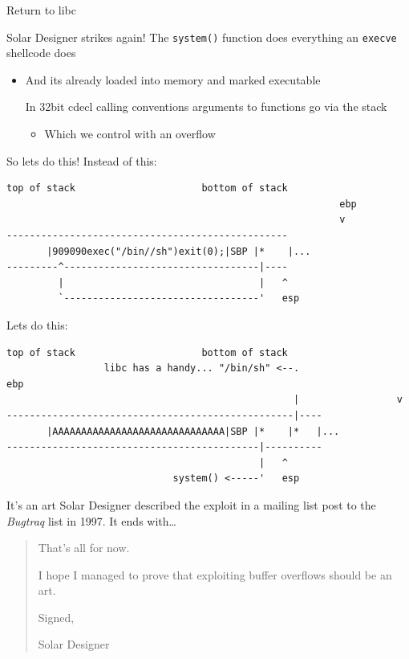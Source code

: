 \documentclass[9pt,aspectratio=169]{beamer}
\begin{document}
\begin{frame}[label={sec:orgd936783},fragile]{Return to libc}
 \begin{block}{Solar Designer strikes again!}
The \texttt{system()} function does everything an \texttt{execve} shellcode does
\begin{itemize}
\item And its already loaded into memory and marked executable

In 32bit cdecl calling conventions arguments to functions go via the stack
\begin{itemize}
\item Which we control with an overflow
\end{itemize}
\end{itemize}
\end{block}
\end{frame}

\begin{frame}[label={sec:org54a452f},fragile]{So lets do this!}
 Instead of this:
\begin{verbatim}
top of stack                      bottom of stack
                                                          ebp
                                                          v
-------------------------------------------------
       |909090exec("/bin//sh")exit(0);|SBP |*    |...
---------^----------------------------------|----
         |                                  |   ^
         `----------------------------------'   esp

\end{verbatim}

Lets do this:
\begin{verbatim}
top of stack                      bottom of stack
                 libc has a handy... "/bin/sh" <--.                 ebp
                                                  |                 v
--------------------------------------------------|----
       |AAAAAAAAAAAAAAAAAAAAAAAAAAAAAA|SBP |*    |*   |...
--------------------------------------------|----------
                                            |   ^
                             system() <-----'   esp
\end{verbatim}
\end{frame}

\begin{frame}[label={sec:org640f27d}]{It's an art}
Solar Designer described the exploit in a mailing list post to the \emph{Bugtraq} list in 1997.
It ends with\ldots{}

\begin{quote}
That's all for now.

I hope I managed to prove that exploiting buffer overflows should be an art.

Signed,

Solar Designer
\end{quote}
\end{frame}
\end{document}
